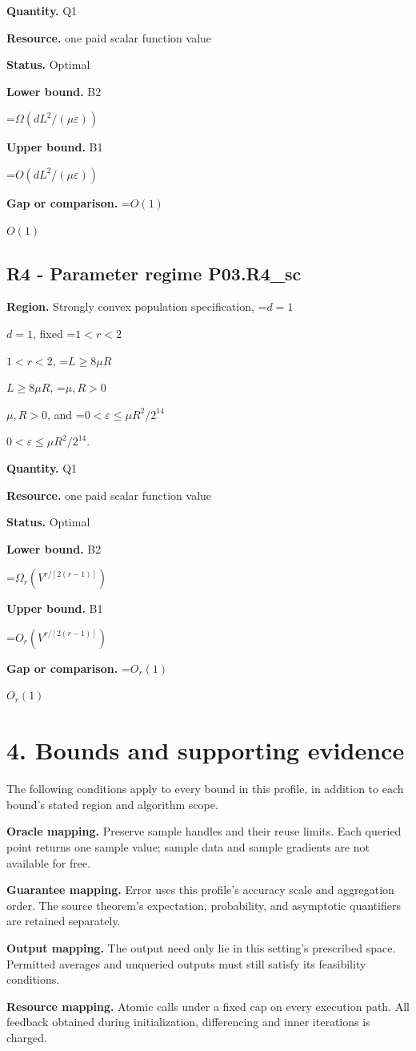 \documentclass[10pt,a4paper]{article}
\newcommand{\AtlasMath}[1]{\par\begingroup\centering\setbox0=\hbox{$\displaystyle #1$}\ifdim\wd0>1.4\linewidth\typeout{ATLAS WIDE FORMULA: \the\wd0}\fi\ifdim\wd0>\linewidth\resizebox{\linewidth}{!}{\box0}\else\box0\fi\par\endgroup}
\newcommand{\AtlasInlineMath}[1]{\begingroup\setbox0=\hbox{$#1$}\ifdim\wd0>.4\linewidth\endgroup\AtlasMath{#1}\else\endgroup$#1$\fi}
\begin{document}
\textbf{Quantity.} Q1

\textbf{Resource.} one paid scalar function value

\textbf{Status.} Optimal

\textbf{Lower bound.} B2

\AtlasMath{\Omega(dL^2/(\mu\varepsilon))}
\textbf{Upper bound.} B1

\AtlasMath{O(dL^2/(\mu\varepsilon))}
\textbf{Gap or comparison.} \AtlasInlineMath{O(1)}

\subsection{R4 - Parameter regime P03.R4\_sc}
\textbf{Region.} Strongly convex population specification, \AtlasInlineMath{d=1}, fixed \AtlasInlineMath{1<r<2}, \AtlasInlineMath{L\ge8\mu R}, \AtlasInlineMath{\mu,R>0}, and \AtlasInlineMath{0<\varepsilon\le\mu R^2/2^{14}}.

\textbf{Quantity.} Q1

\textbf{Resource.} one paid scalar function value

\textbf{Status.} Optimal

\textbf{Lower bound.} B2

\AtlasMath{\Omega_r(V^{r/[2(r-1)]})}
\textbf{Upper bound.} B1

\AtlasMath{O_r(V^{r/[2(r-1)]})}
\textbf{Gap or comparison.} \AtlasInlineMath{O_r(1)}

\section{4. Bounds and supporting evidence}
The following conditions apply to every bound in this profile, in addition to each bound's stated region and algorithm scope.

\textbf{Oracle mapping.} Preserve sample handles and their reuse limits. Each queried point returns one sample value; sample data and sample gradients are not available for free.

\textbf{Guarantee mapping.} Error uses this profile's accuracy scale and aggregation order. The source theorem's expectation, probability, and asymptotic quantifiers are retained separately.

\textbf{Output mapping.} The output need only lie in this setting's prescribed space. Permitted averages and unqueried outputs must still satisfy its feasibility conditions.

\textbf{Resource mapping.} Atomic calls under a fixed cap on every execution path. All feedback obtained during initialization, differencing and inner iterations is charged.
\end{document}
